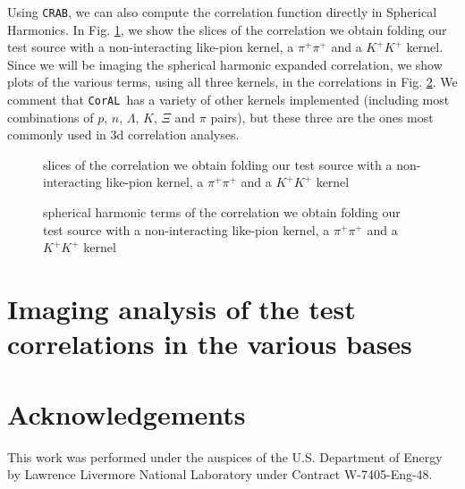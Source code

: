 \documentclass[aps,prl,twocolumn,floatfix,preprintnumbers,showpacs]{revtex4}
\newcommand{\CorAL}{{\tt CorAL}}
\newcommand{\CRAB}{{\tt CRAB}}
\begin{document}
Using \CRAB, we can also compute the correlation  function directly in Spherical Harmonics.  In Fig. \ref{corrTailSlice}, we show the slices of the correlation  we obtain folding our test source with a non-interacting like-pion kernel, a $\pi^{+}\pi^{+}$  and a $K^{+}K^{+}$ kernel.   Since we will be imaging the spherical harmonic expanded correlation, we show plots of the various terms, using all three kernels, in the correlations in Fig. \ref{corrTailTerm}.  We comment that \CorAL\ has a variety of other kernels implemented (including most combinations of $p$, $n$, $\Lambda$, $K$, $\Xi$ and $\pi$ pairs), but these three are the ones most commonly used in 3d correlation analyses.    

\begin{figure}
\caption{\label{corrTailSlice} slices of the correlation  we obtain folding our test source with a non-interacting like-pion kernel, a $\pi^{+}\pi^{+}$  and a $K^{+}K^{+}$ kernel}    
\end{figure}

\begin{figure}
\caption{\label{corrTailTerm} spherical harmonic terms of the correlation  we obtain folding our test source with a non-interacting like-pion kernel, a $\pi^{+}\pi^{+}$  and a $K^{+}K^{+}$ kernel}    
\end{figure}

\section{Imaging analysis of the test correlations in the various bases}    

\section*{Acknowledgements}
This work was performed under the auspices of the U.S. Department of Energy by Lawrence Livermore National  Laboratory under Contract W-7405-Eng-48.  
\nobreak
\end{document}
